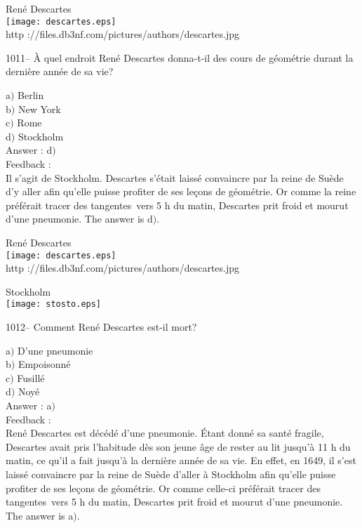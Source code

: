 ﻿\documentclass[letterpaper, 12pt]{article}
\begin{document}
        \begin{center}
        Ren\'e Descartes\\
    \texttt{[image: descartes.eps]}\\
        {\footnotesize http
://files.db3nf.com/pictures/authors/descartes.jpg}
    \end{center}

1011-- \`A quel endroit Ren\'e Descartes donna-t-il des cours de
g\'eom\'etrie durant la derni\`ere ann\'ee de sa vie?

a$)$ Berlin \\
b$)$ New York \\
c$)$ Rome \\
d$)$ Stockholm\\

Answer : d$)$\\

Feedback :\\
Il s'agit de Stockholm. Descartes s'\'etait laiss\'e convaincre par
la reine de Su\`ede d'y aller afin qu'elle puisse profiter de ses
le\c cons de g\'eom\'etrie.  Or comme la reine pr\'ef\'erait \og
tracer des tangentes\fg\ vers 5 h du matin, Descartes prit froid et
mourut d'une pneumonie.
The answer is d$)$.\\

        \begin{center}
        Ren\'e Descartes\\
    \texttt{[image: descartes.eps]}\\
        {\footnotesize http
://files.db3nf.com/pictures/authors/descartes.jpg}
    \end{center}

        \begin{center}
        Stockholm\\
    \texttt{[image: stosto.eps]}\\
    \end{center}

1012-- Comment Ren\'e Descartes est-il mort?

a$)$ D'une pneumonie \\
b$)$ Empoisonn\'e \\
c$)$ Fusill\'e \\
d$)$ Noy\'e\\

Answer : a$)$\\

Feedback :\\
Ren\'e Descartes est d\'ec\'ed\'e d'une pneumonie. \'Etant donn\'e
sa sant\'e fragile, Descartes avait pris l'habitude d\`es son jeune
\^age de rester au lit jusqu'\`a 11 h du matin, ce qu'il a fait
jusqu'\`a la derni\`ere ann\'ee de sa vie.  En effet, en 1649, il
s'est laiss\'e convaincre par la reine de Su\`ede d'aller \`a
Stockholm afin qu'elle puisse profiter de ses le\c cons de
g\'eom\'etrie.  Or comme celle-ci pr\'ef\'erait \og tracer des
tangentes\fg\ vers 5 h du matin, Descartes prit froid et mourut
d'une pneumonie.
The answer is a$)$.\\
\end{document}
